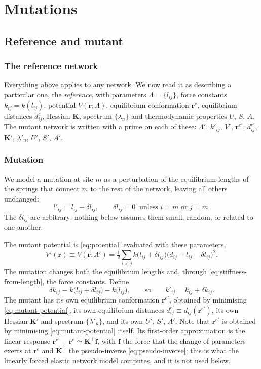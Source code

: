 \documentclass[11pt]{article}
\newcommand{\rr}{\mathbf{r}}
\newcommand{\KK}{\mathbf{K}}
\newcommand{\LL}{\Lambda}
\newcommand{\re}{\rr^{e}}
\newcommand{\rem}{\rr^{e\prime}}   %
\newcommand{\dije}{d^{e}_{ij}}
\newcommand{\dijem}{d^{e\prime}_{ij}}
\newcommand{\lijm}{l'_{ij}}
\newcommand{\kijm}{k'_{ij}}
\newcommand{\dlij}{\delta l_{ij}}
\newcommand{\dkij}{\delta k_{ij}}
\newcommand{\lij}{l_{ij}}
\newcommand{\kij}{k_{ij}}
\newcommand{\dij}{d_{ij}}
\begin{document}
\section{Mutations}
\label{sec:mutation}

\subsection{Reference and mutant}

\subsubsection{The reference network}

Everything above applies to any network.
We now read it as describing a particular one, the \emph{reference}, with parameters $\LL = \{\lij\}$, force constants $\kij = k(\lij)$, potential $V(\rr;\LL)$, equilibrium conformation $\re$, equilibrium distances $\dije$, Hessian $\KK$, spectrum $\{\lambda_n\}$ and thermodynamic properties $U$, $S$, $A$.
The mutant network is written with a prime on each of these: $\LL'$, $\kijm$, $V'$, $\rem$, $\dijem$, $\KK'$, $\lambda'_n$, $U'$, $S'$, $A'$.

\subsubsection{Mutation}

We model a mutation at site $m$ as a perturbation of the equilibrium lengths of the springs that connect $m$ to the rest of the network, leaving all others unchanged:
\begin{equation}
\lijm = \lij + \dlij,
\qquad
\dlij = 0 \ \text{ unless } i = m \text{ or } j = m.
\label{eq:mutation-perturbation}
\end{equation}
The $\dlij$ are arbitrary: nothing below assumes them small, random, or related to one another.

The mutant potential is \eqref{eq:potential} evaluated with these parameters,
\begin{equation}
V'(\rr) \equiv V(\rr; \LL')
= \tfrac12 \sum_{i<j} k\big(\lij + \dlij\big)
\big(\dij - \lij - \dlij\big)^{2}.
\label{eq:mutant-potential}
\end{equation}
The mutation changes both the equilibrium lengths and, through \eqref{eq:stiffness-from-length}, the force constants.
Define
\begin{equation}
\dkij \equiv k\big(\lij + \dlij\big) - k\big(\lij\big),
\qquad\text{so}\qquad
\kijm = \kij + \dkij.
\label{eq:stiffness-change}
\end{equation}
The mutant has its own equilibrium conformation $\rem$, obtained by minimising \eqref{eq:mutant-potential}, its own equilibrium distances $\dijem \equiv \dij(\rem)$, its own Hessian $\KK'$ and spectrum $\{\lambda'_n\}$, and its own $U'$, $S'$, $A'$.
Note that $\rem$ is obtained by minimising \eqref{eq:mutant-potential} itself.
Its first-order approximation is the linear response $\rem - \re \simeq \KK^{+}\mathbf{f}$, with $\mathbf{f}$ the force that the change of parameters exerts at $\re$ and $\KK^{+}$ the pseudo-inverse \eqref{eq:pseudo-inverse}; this is what the linearly forced elastic network model computes, and it is not used below.
\end{document}
